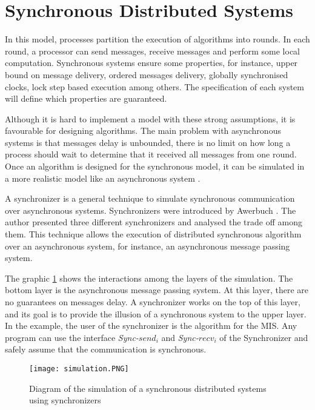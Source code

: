 \section{Synchronous Distributed Systems}
\label{chap:3}

In this model, processes partition the execution of algorithms into rounds. In each round, a processor can send messages, receive messages and perform some local computation. Synchronous systems ensure some properties, for instance, upper bound on message delivery, ordered messages delivery, globally synchronised clocks, lock step based execution among others.  The specification of each system will define which properties are guaranteed. 


Although it is hard to implement a model with these strong assumptions, it is favourable for designing algorithms. The main problem with asynchronous systems is that messages delay is unbounded, there is no limit on how long a process should wait to determine that it received all messages from one round. Once an algorithm is designed for the synchronous model, it can be simulated in a more realistic model like an asynchronous system \cite{attiya2004distributed}.

A synchronizer is a general technique to simulate synchronous communication over asynchronous systems. Synchronizers were introduced by Awerbuch \cite{awerbuch1985complexity}. The author presented three different synchronizers and analysed the trade off among them. This technique allows the execution of distributed synchronous algorithm over an asynchronous system, for instance, an asynchronous message passing system.   

The graphic \ref{fig:simulation} shows the interactions among the layers of the simulation. The bottom layer is the asynchronous message passing system. At this layer, there are no guarantees on messages delay. A synchronizer works on the top of this layer, and its goal is to provide the illusion of a synchronous system to the upper layer. In the example, the user of the synchronizer is the algorithm for the MIS. Any program can use the interface \textit{Sync-}$send_i$ and \textit{Sync-}$recv_i$ of the Synchronizer and safely assume that the communication is synchronous.         

\begin{figure}[ht]
\centering
\texttt{[image: simulation.PNG]} 
\caption{Diagram of the simulation of a synchronous distributed systems using synchronizers}
\label{fig:simulation}
\end{figure}



